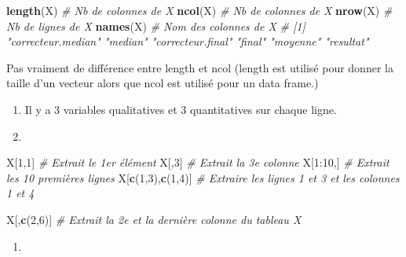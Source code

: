 \documentclass[
]{article}
\newenvironment{Shaded}{}{}
\newcommand{\CommentTok}[1]{\textcolor[rgb]{0.38,0.63,0.69}{\textit{#1}}}
\newcommand{\DecValTok}[1]{\textcolor[rgb]{0.25,0.63,0.44}{#1}}
\newcommand{\KeywordTok}[1]{\textcolor[rgb]{0.00,0.44,0.13}{\textbf{#1}}}
\newcommand{\NormalTok}[1]{#1}
\newcommand{\OperatorTok}[1]{\textcolor[rgb]{0.40,0.40,0.40}{#1}}
\newcommand{\StringTok}[1]{\textcolor[rgb]{0.25,0.44,0.63}{#1}}
\providecommand{\tightlist}{%
  \setlength{\itemsep}{0pt}\setlength{\parskip}{0pt}}
\begin{document}
\begin{Shaded}
\begin{Highlighting}[]
\KeywordTok{length}\NormalTok{(X) }\CommentTok{\# Nb de colonnes de X }
\KeywordTok{ncol}\NormalTok{(X) }\CommentTok{\# Nb de colonnes de X}
\KeywordTok{nrow}\NormalTok{(X) }\CommentTok{\# Nb de lignes de X}
\KeywordTok{names}\NormalTok{(X) }\CommentTok{\# Nom des colonnes de X}
\CommentTok{\# [1] "correcteur.median" "median"            "correcteur.final"  "final"             "moyenne"           "resultat"}
\end{Highlighting}
\end{Shaded}

Pas vraiment de différence entre length et ncol (length est utilisé pour
donner la taille d'un vecteur alors que ncol est utilisé pour un data
frame.)

\begin{enumerate}
\def\labelenumi{\arabic{enumi}.}
\setcounter{enumi}{12}
\item
  Il y a 3 variables qualitatives et 3 quantitatives sur chaque ligne.
\item
\end{enumerate}

\begin{Shaded}
\begin{Highlighting}[]
\NormalTok{X[}\DecValTok{1}\NormalTok{,}\DecValTok{1}\NormalTok{] }\CommentTok{\# Extrait le 1er élément}
\NormalTok{X[,}\DecValTok{3}\NormalTok{] }\CommentTok{\# Extrait la 3e colonne}
\NormalTok{X[}\DecValTok{1}\OperatorTok{:}\DecValTok{10}\NormalTok{,] }\CommentTok{\# Extrait les 10 premières lignes}
\NormalTok{X[}\KeywordTok{c}\NormalTok{(}\DecValTok{1}\NormalTok{,}\DecValTok{3}\NormalTok{),}\KeywordTok{c}\NormalTok{(}\DecValTok{1}\NormalTok{,}\DecValTok{4}\NormalTok{)] }\CommentTok{\# Extraire les lignes 1 et 3 et les colonnes 1 et 4}

\NormalTok{X[,}\KeywordTok{c}\NormalTok{(}\DecValTok{2}\NormalTok{,}\DecValTok{6}\NormalTok{)] }\CommentTok{\# Extrait la 2e et la dernière colonne du tableau X}
\end{Highlighting}
\end{Shaded}

\begin{enumerate}
\def\labelenumi{\arabic{enumi}.}
\setcounter{enumi}{14}
\tightlist
\item
\end{enumerate}

\begin{Shaded}
\end{Shaded}
\end{document}

